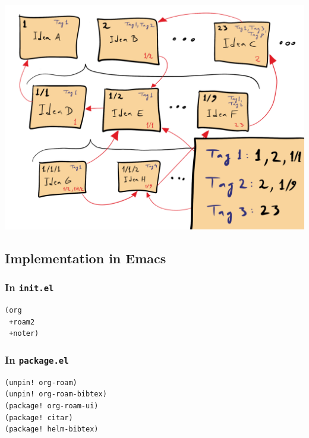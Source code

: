 \documentclass[11pt]{article}
\begin{document}
\begin{center}
\includegraphics[width=.9\linewidth]{./zk_link.png}
\end{center}

\subsection{Implementation in Emacs}
\label{sec:org893ed86}

\subsubsection{In \texttt{init.el}}
\label{sec:orgab5d17d}
\begin{verbatim}
(org
 +roam2
 +noter)
\end{verbatim}


\subsubsection{In \texttt{package.el}}
\label{sec:org98aea88}

\begin{verbatim}
(unpin! org-roam)
(unpin! org-roam-bibtex)
(package! org-roam-ui)
(package! citar)
(package! helm-bibtex)

\end{verbatim}
\end{document}

